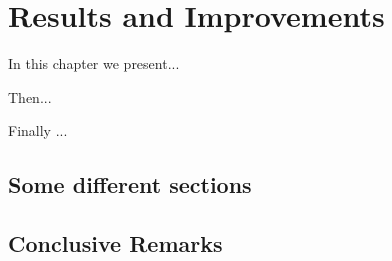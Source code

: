\chapter{Results and Improvements}
\label{chap:Improvements}
\pagestyle{plain}
\vspace{0.5cm}

\noindent In this chapter we present...

Then...

Finally ...


\section{Some different sections}

\section{Conclusive Remarks}
